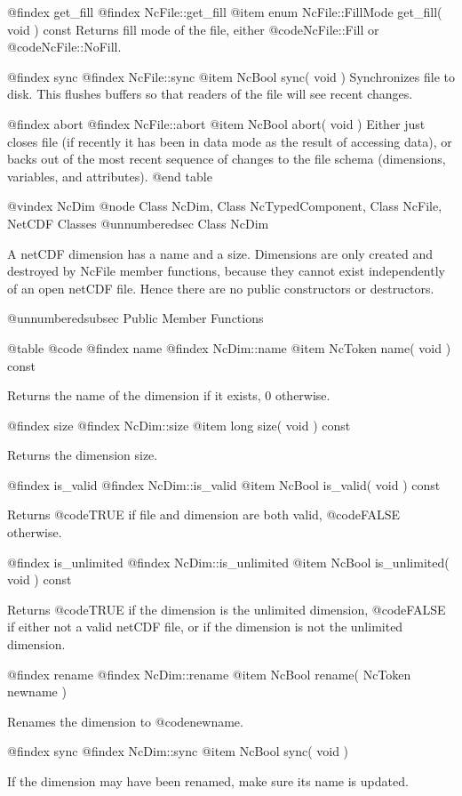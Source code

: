 @findex get_fill
@findex NcFile::get_fill
@item enum NcFile::FillMode get_fill( void ) const
Returns fill mode of the file, either @code{NcFile::Fill} or
@code{NcFile::NoFill}.

@findex sync
@findex NcFile::sync
@item NcBool sync( void )
Synchronizes file to disk.  This flushes buffers so that readers
of the file will see recent changes.

@findex abort
@findex NcFile::abort
@item NcBool abort( void )
Either just closes file (if recently it has been in data mode as the
result of accessing data), or backs out of the most recent sequence of
changes to the file schema (dimensions, variables, and attributes).
@end table

@vindex NcDim
@node Class NcDim, Class NcTypedComponent, Class NcFile, NetCDF Classes
@unnumberedsec  Class NcDim

A netCDF dimension has a name and a size.  Dimensions are only created and
destroyed by NcFile member functions, because they cannot exist
independently of an open netCDF file.  Hence there are no public
constructors or destructors.

@unnumberedsubsec Public Member Functions

@table @code
@findex name
@findex NcDim::name
@item NcToken name( void ) const

Returns the name of the dimension if it exists, 0 otherwise.

@findex size
@findex NcDim::size
@item long size( void ) const

Returns the dimension size.

@findex is_valid
@findex NcDim::is_valid
@item NcBool is_valid( void ) const

Returns @code{TRUE} if file and dimension are both valid, @code{FALSE}
otherwise.

@findex is_unlimited
@findex NcDim::is_unlimited
@item NcBool is_unlimited( void ) const

Returns @code{TRUE} if the dimension is the unlimited dimension,
@code{FALSE} if either not a valid netCDF file, or if the dimension is
not the unlimited dimension.

@findex rename
@findex NcDim::rename
@item NcBool rename( NcToken newname )

Renames the dimension to @code{newname}.

@findex sync
@findex NcDim::sync
@item NcBool sync( void )

If the dimension may have been renamed, make sure its name is updated.

